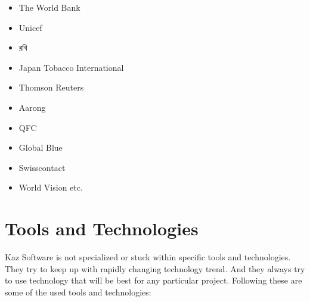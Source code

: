 \begin{itemize}
    \item The World Bank 
    \item Unicef
    \item \textbengali{রবি}
    \item Japan Tobacco International
    \item Thomson Reuters
    \item Aarong
    \item QFC
    \item Global Blue
    \item Swisscontact
    \item World Vision etc.
\end{itemize}

\section{Tools and Technologies}

Kaz Software is not specialized or stuck within specific tools and technologies.
They try to keep up with rapidly changing technology trend.
And they always try to use technology that will be best for any particular project.
Following these are some of the used tools and technologies:

